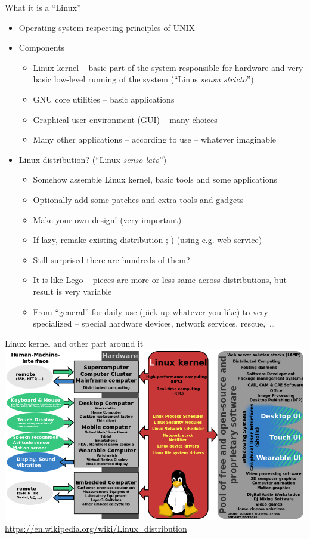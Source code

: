 \documentclass[compress, ucs, xelatex, 11pt, xcolor=svgnames,
  hyperref={
    bookmarks=true,
    unicode=true,
    colorlinks=true,
    pdftitle={Linux, command line and MetaCentrum},
    plainpages=false,
    pdfauthor={Vojtech Zeisek},
    pdfsubject={Course about use of Linux command line, writing shell scripts and using MetaCentrum of CESNET},
    pdfcreator={XeLaTeX},
    pdfkeywords={Linux, GNU, BASH, shell, command line, MetaCentrum},
    linkcolor=Red,
    anchorcolor=Blue,
    citecolor=Purple,
    filecolor=DodgerBlue,
    menucolor=DarkOrchid,
    urlcolor=DeepSkyBlue,
    pdftex},
  url={hyphens, lowtilde} %
  ]{beamer}
\begin{document}
\begin{frame}{What it is a ``Linux''}
\begin{itemize}
  \item Operating system respecting principles of UNIX
  \item Components
  \begin{itemize}
    \item Linux kernel -- basic part of the system responsible for hardware and very basic low-level running of the system (``Linus \textit{sensu stricto}'')
    \item GNU core utilities -- basic applications
    \item Graphical user environment (GUI) -- many choices
    \item Many other applications -- according to use -- whatever imaginable
  \end{itemize}
  \item Linux distribution? (``Linux \textit{senso lato}'')
  \begin{itemize}
    \item Somehow assemble Linux kernel, basic tools and some applications
    \item Optionally add some patches and extra tools and gadgets
    \item Make your own design! (very important)
    \item If lazy, remake existing distribution ;-) (using e.g. \href{https://susestudio.com/}{web service})
    \item Still surprised there are hundreds of them?
    \item It is like Lego -- pieces are more or less same across distributions, but result is very variable
    \item From ``general'' for daily use (pick up whatever you like) to very specialized -- special hardware devices, network services, rescue,~\ldots
  \end{itemize}
\end{itemize}
\end{frame}

\begin{frame}{Linux kernel and other part around it}
  \includegraphics[width=\textwidth]{linux_kernel_ubiquity.png}\\
  \url{https://en.wikipedia.org/wiki/Linux_distribution}
\end{frame}
\end{document}
